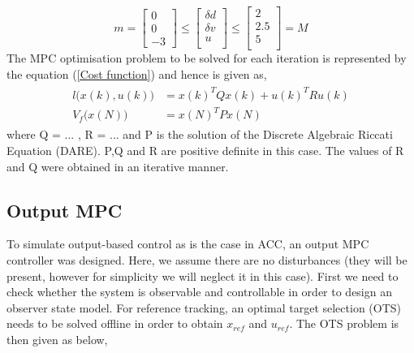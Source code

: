 \begin{equation}
\label{condition1}
    m=
    \begin{bmatrix}
    0 \\ 0 \\ -3
    \end{bmatrix}
    \leq
    \begin{bmatrix}
    \delta d \\ \delta v \\ u \\
    \end{bmatrix}
    \leq
    \begin{bmatrix}
    2 \\ 2.5 \\ 5 \\
    \end{bmatrix}
    =M
\end{equation}
The MPC optimisation problem to be solved for each iteration is represented by the equation ({\ref{Cost function}}) and hence is given as,
\begin{gather}
    \begin{aligned}
        l\big(x(k),u(k)\big) &= x(k)^TQx(k) + u(k)^TRu(k)\\
        V_f\big(x(N)\big) &= x(N)^TPx(N)
    \end{aligned}
\end{gather}
where Q = ... , R = ... and P is the solution of the Discrete Algebraic Riccati Equation (DARE). P,Q and R are positive definite in this case. The values of R and Q were obtained in an iterative manner. 

\subsection{Output MPC}
To simulate output-based control as is the case in ACC, an output MPC controller was designed. Here, we assume there are no disturbances (they will be present, however for simplicity we will neglect it in this case). First we need to check whether the system is observable and controllable in order to design an observer state model. For reference tracking, an optimal target selection (OTS) needs to be solved offline in order to obtain $x_{ref}$ and $u_{ref}$. The OTS problem is then given as below,


